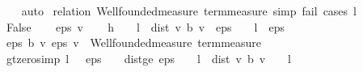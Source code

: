 \begin{isabellebody}
%
\isadelimproof
\ \ %
\endisadelimproof
%
\isatagproof
{}\isamarkupfalse%
\ auto%
\endisatagproof
{\isafoldproof}%
%
\isadelimproof
\isanewline
%
\endisadelimproof
\isanewline
{}\isamarkupfalse%
\isanewline
%
\isadelimproof
%
\endisadelimproof
%
\isatagproof
{}\isamarkupfalse%
\ {\isacharparenleft}{\kern0pt}relation\ {\isachardoublequoteopen}Wellfounded{\isachardot}{\kern0pt}measure\ term{\isacharunderscore}{\kern0pt}measure{\isachardoublequoteclose}{\isacharcomma}{\kern0pt}\ {\isacharparenleft}{\kern0pt}simp{\isacharsemicolon}{\kern0pt}\ fail{\isacharparenright}{\kern0pt}{\isacharcomma}{\kern0pt}\ cases\ {\isachardoublequoteopen}l\ {\isacharequal}{\kern0pt}\ {}{\isachardoublequoteclose}{\isacharparenright}{\kern0pt}\isanewline
\ \ \isamarkupfalse%
\ False\isanewline
\ \ \isamarkupfalse%
\ eps\ v\isanewline
\ \ \isamarkupfalse%
\ h{\isacharcolon}{\kern0pt}\ {\isachardoublequoteopen}{\isasymnot}\ {\isacharparenleft}{\kern0pt}{}\ {\isacharasterisk}{\kern0pt}\ l\ {\isacharasterisk}{\kern0pt}\ dist\ v\ {\isacharparenleft}{\kern0pt}{\isasymL}\isactrlsub b\ v{\isacharparenright}{\kern0pt}\ {\isacharless}{\kern0pt}\ eps\ {\isacharasterisk}{\kern0pt}\ {\isacharparenleft}{\kern0pt}{}\ {\isacharminus}{\kern0pt}\ l{\isacharparenright}{\kern0pt}\ {\isasymor}\ eps\ {\isasymle}\ {}{\isacharparenright}{\kern0pt}{\isachardoublequoteclose}\isanewline
\ \ \isamarkupfalse%
\ {\isachardoublequoteopen}{\isacharparenleft}{\kern0pt}{\isacharparenleft}{\kern0pt}eps{\isacharcomma}{\kern0pt}\ {\isasymL}\isactrlsub b\ v{\isacharparenright}{\kern0pt}{\isacharcomma}{\kern0pt}\ eps{\isacharcomma}{\kern0pt}\ v{\isacharparenright}{\kern0pt}\ {\isasymin}\ Wellfounded{\isachardot}{\kern0pt}measure\ term{\isacharunderscore}{\kern0pt}measure{\isachardoublequoteclose}\isanewline
\ \ \isamarkupfalse%
\ {\isacharminus}{\kern0pt}\isanewline
\ \ \ \ \isamarkupfalse%
\ gt{\isacharunderscore}{\kern0pt}zero{\isacharbrackleft}{\kern0pt}simp{\isacharbrackright}{\kern0pt}{\isacharcolon}{\kern0pt}\ {\isachardoublequoteopen}l\ {\isasymnoteq}\ {}{\isachardoublequoteclose}\ {\isachardoublequoteopen}eps\ {\isachargreater}{\kern0pt}\ {}{\isachardoublequoteclose}\ \ dist{\isacharunderscore}{\kern0pt}ge{\isacharcolon}{\kern0pt}\ {\isachardoublequoteopen}eps\ {\isacharasterisk}{\kern0pt}\ {\isacharparenleft}{\kern0pt}{}\ {\isacharminus}{\kern0pt}\ l{\isacharparenright}{\kern0pt}\ {\isasymle}\ dist\ v\ {\isacharparenleft}{\kern0pt}{\isasymL}\isactrlsub b\ v{\isacharparenright}{\kern0pt}\ {\isacharasterisk}{\kern0pt}\ {\isacharparenleft}{\kern0pt}{}\ {\isacharasterisk}{\kern0pt}\ l{\isacharparenright}{\kern0pt}{\isachardoublequoteclose}\isanewline

\end{isabellebody}

